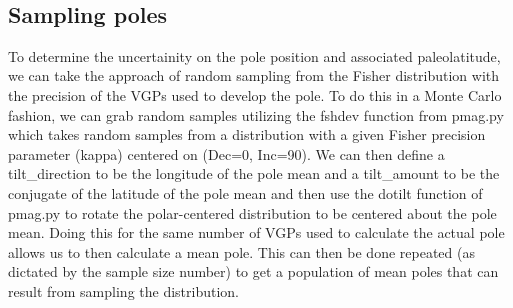 \documentclass{article}
\begin{document}
    \begin{center}
    \end{center}
    { \hspace*{\fill} \\}
    

    \subsection{Sampling poles}


    To determine the uncertainity on the pole position and associated
paleolatitude, we can take the approach of random sampling from the
Fisher distribution with the precision of the VGPs used to develop the
pole. To do this in a Monte Carlo fashion, we can grab random samples
utilizing the fshdev function from pmag.py which takes random samples
from a distribution with a given Fisher precision parameter (kappa)
centered on (Dec=0, Inc=90). We can then define a tilt\_direction to be
the longitude of the pole mean and a tilt\_amount to be the conjugate of
the latitude of the pole mean and then use the dotilt function of
pmag.py to rotate the polar-centered distribution to be centered about
the pole mean. Doing this for the same number of VGPs used to calculate
the actual pole allows us to then calculate a mean pole. This can then
be done repeated (as dictated by the sample size number) to get a
population of mean poles that can result from sampling the distribution.
\end{document}

